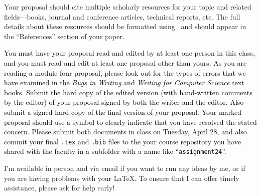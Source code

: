 Your proposal should cite multiple scholarly resources for your topic and related fields---books, journal and conference
articles, technical reports, etc. The full details about these resources should be formatted using \BibTeX\ and should
appear in the ``References'' section of your paper.

\textcolor{black}{You must have your proposal read and edited by at least one person in this class, and you must read
  and edit at least one proposal other than yours.  As you are reading a module four proposal, please look out for the
  types of errors that we have examined in the {\em Bugs in Writing} and {\em Writing for Computer Science} text books.
  Submit the hard copy of the edited version (with hand-written comments by the editor) of your proposal signed by both
  the writer and the editor.  Also submit a signed hard copy of the final version of your proposal.  Your marked
  proposal should use a symbol to clearly indicate that you have resolved the stated concern. Please submit both
  documents in class on Tuesday, April 28, and also commit your final {\tt .tex} and {\tt .bib} files to the your course
  repository you have shared with the faculty in a subfolder with a name like ``{\tt assignment24}''.}

I'm available in person and via email if you want to run any ideas by me, or if you are having problems with your
\LaTeX. To ensure that I can offer timely assistance, please ask for help early!


